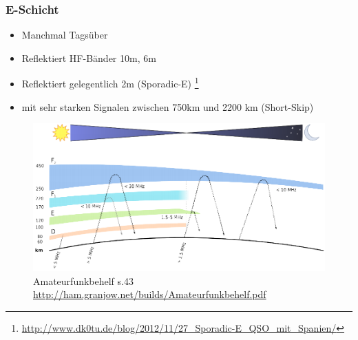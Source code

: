 \begin{frame}
    \frametitle{E-Schicht}
    \begin{itemize}
    		\item Manchmal Tagsüber
			\item Reflektiert HF-Bänder 10m, 6m
            \item Reflektiert gelegentlich 2m (Sporadic-E) \footnote{\tiny \url{http://www.dk0tu.de/blog/2012/11/27_Sporadic-E_QSO_mit_Spanien/}}
            \item mit sehr starken Signalen zwischen 750km und 2200 km (Short-Skip)
    \end{itemize}
    \begin{center}
      \begin{figure}
        \includegraphics[width=.8\textwidth,height=.4\textheight,keepaspectratio]{e09/schichten_behelf_43.png}
       \caption{Amateurfunkbehelf s.43 \ExternalLink \url{http://ham.granjow.net/builds/Amateurfunkbehelf.pdf}}
      \end{figure}
    \end{center}
\end{frame}

